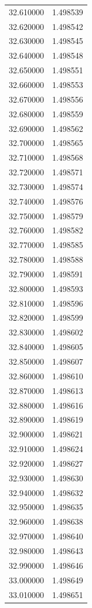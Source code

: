 \begin{tabular}{rr}
32.610000 & 1.498539 \\
32.620000 & 1.498542 \\
32.630000 & 1.498545 \\
32.640000 & 1.498548 \\
32.650000 & 1.498551 \\
32.660000 & 1.498553 \\
32.670000 & 1.498556 \\
32.680000 & 1.498559 \\
32.690000 & 1.498562 \\
32.700000 & 1.498565 \\
32.710000 & 1.498568 \\
32.720000 & 1.498571 \\
32.730000 & 1.498574 \\
32.740000 & 1.498576 \\
32.750000 & 1.498579 \\
32.760000 & 1.498582 \\
32.770000 & 1.498585 \\
32.780000 & 1.498588 \\
32.790000 & 1.498591 \\
32.800000 & 1.498593 \\
32.810000 & 1.498596 \\
32.820000 & 1.498599 \\
32.830000 & 1.498602 \\
32.840000 & 1.498605 \\
32.850000 & 1.498607 \\
32.860000 & 1.498610 \\
32.870000 & 1.498613 \\
32.880000 & 1.498616 \\
32.890000 & 1.498619 \\
32.900000 & 1.498621 \\
32.910000 & 1.498624 \\
32.920000 & 1.498627 \\
32.930000 & 1.498630 \\
32.940000 & 1.498632 \\
32.950000 & 1.498635 \\
32.960000 & 1.498638 \\
32.970000 & 1.498640 \\
32.980000 & 1.498643 \\
32.990000 & 1.498646 \\
33.000000 & 1.498649 \\
33.010000 & 1.498651 \\

\end{tabular}
